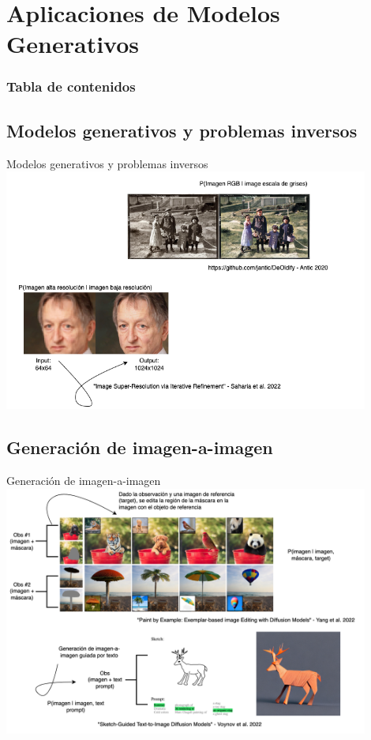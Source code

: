 \documentclass[9pt]{beamer}
\begin{document}
\section{Aplicaciones de Modelos Generativos}
\begin{frame}
    \frametitle{Tabla de contenidos}
    \tableofcontents[currentsection]
\end{frame}

\subsection{Modelos generativos y problemas inversos}
\begin{frame}{Modelos generativos y problemas inversos}
    \centering
    \includegraphics[width=0.9\textwidth]{diapositivas/img/inverse-problems.png}
\end{frame}


\subsection{Generación de imagen-a-imagen}
\begin{frame}{Generación de imagen-a-imagen}
    \centering
    \includegraphics[width=0.9\textwidth]{diapositivas/img/img-to-img-dpi200.png}
\end{frame}
\end{document}
